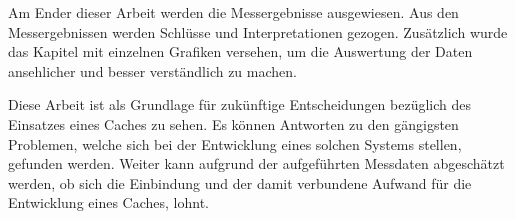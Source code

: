 Am Ender dieser Arbeit werden die Messergebnisse ausgewiesen. Aus den Messergebnissen werden Schlüsse und Interpretationen gezogen. Zusätzlich wurde das Kapitel mit einzelnen Grafiken versehen, um die Auswertung der Daten ansehlicher und besser verständlich zu machen.

Diese Arbeit ist als Grundlage für zukünftige Entscheidungen bezüglich des Einsatzes eines Caches zu sehen. Es können Antworten zu den gängigsten Problemen, welche sich bei der Entwicklung eines solchen Systems stellen, gefunden werden. Weiter kann aufgrund der aufgeführten Messdaten abgeschätzt werden, ob sich die Einbindung und der damit verbundene Aufwand für die Entwicklung eines Caches, lohnt.
